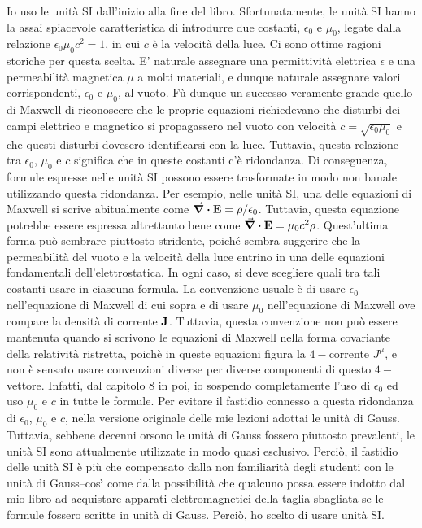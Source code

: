 Io uso le unità SI dall'inizio alla fine del libro. Sfortunatamente, le unità SI hanno la assai spiacevole caratteristica di introdurre due costanti, $\epsilon_0$ e $\mu_0$, legate dalla relazione $\epsilon_0 \mu_0 c^2 = 1$, in cui $c$ è la velocità della luce. Ci sono ottime ragioni storiche per questa scelta. E' naturale assegnare una permittività elettrica $\epsilon$ e una permeabilità magnetica $\mu$ a molti materiali, e dunque naturale assegnare valori corrispondenti, $\epsilon_0$ e $\mu_0$, al vuoto. Fù dunque un successo veramente grande quello di Maxwell di riconoscere che le proprie equazioni richiedevano che disturbi dei campi elettrico e magnetico si propagassero nel vuoto con velocità $c=\sqrt{\epsilon_0 \mu_0}$  e che questi disturbi dovesero identificarsi con la luce. Tuttavia, questa relazione tra $\epsilon_0$, $\mu_0$ e $c$ significa che in queste costanti c'è ridondanza. Di conseguenza, formule espresse nelle unità SI possono essere trasformate in modo non banale utilizzando questa ridondanza. Per esempio, nelle unità SI, una delle equazioni di Maxwell si scrive abitualmente come $\div{\vb{E}} = \rho / \epsilon_0 $. Tuttavia, questa equazione potrebbe essere espressa altrettanto bene come  $\div{\vb{E}} = \mu_0 c^2 \rho$. Quest'ultima forma può sembrare piuttosto stridente, poiché sembra suggerire che la permeabilità del vuoto e la velocità della luce entrino in una delle equazioni fondamentali dell'elettrostatica. In ogni caso, si deve scegliere quali tra tali costanti usare in ciascuna formula. La convenzione usuale è di usare $\epsilon_0$ nell'equazione di Maxwell di cui sopra e di usare $\mu_0$ nell'equazione di Maxwell ove compare la densità di corrente $\vb{J}$. Tuttavia, questa convenzione non può essere mantenuta quando si scrivono le equazioni di Maxwell nella forma covariante della relatività ristretta, poichè in queste equazioni figura la $4-$corrente $J^{\mu}$, e non è sensato usare convenzioni diverse per diverse componenti di questo $4-$vettore. Infatti, dal capitolo 8 in poi, io sospendo completamente l'uso di $\epsilon_0$ ed uso $\mu_0$  e $c$ in tutte le formule. Per evitare il fastidio connesso a questa ridondanza di $\epsilon_0$, $\mu_0$ e $c$, nella versione originale delle mie lezioni adottai le unità di Gauss. Tuttavia, sebbene decenni orsono le unità di Gauss fossero piuttosto prevalenti, le unità SI sono attualmente utilizzate in modo quasi esclusivo. Perciò, il fastidio delle unità SI è più che compensato dalla non familiarità degli studenti con le unità di Gauss--così come dalla possibilità che qualcuno possa essere indotto dal mio libro ad acquistare apparati elettromagnetici della taglia sbagliata se le formule fossero scritte in unità di Gauss. Perciò, ho scelto di usare unità SI. 


